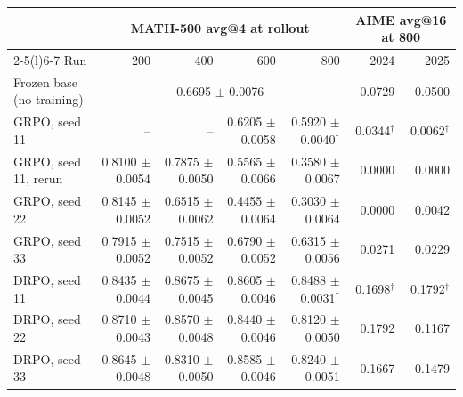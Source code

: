 \begin{tabularx}{\textwidth}{@{}Xrrrrrr@{}}
\toprule
 & \multicolumn{4}{c}{MATH-500 avg@4 at rollout} & \multicolumn{2}{c}{AIME avg@16 at 800} \\
\cmidrule(lr){2-5}\cmidrule(l){6-7}
Run & 200 & 400 & 600 & 800 & 2024 & 2025 \\
\midrule
Frozen base (no training) & \multicolumn{4}{c}{0.6695 $\pm$ 0.0076} & 0.0729 & 0.0500 \\
GRPO, seed 11 & -- & -- & 0.6205 $\pm$ 0.0058 & 0.5920 $\pm$ 0.0040$^{\dagger}$ & 0.0344$^{\dagger}$ & 0.0062$^{\dagger}$ \\
GRPO, seed 11, rerun & 0.8100 $\pm$ 0.0054 & 0.7875 $\pm$ 0.0050 & 0.5565 $\pm$ 0.0066 & 0.3580 $\pm$ 0.0067 & 0.0000 & 0.0000 \\
GRPO, seed 22 & 0.8145 $\pm$ 0.0052 & 0.6515 $\pm$ 0.0062 & 0.4455 $\pm$ 0.0064 & 0.3030 $\pm$ 0.0064 & 0.0000 & 0.0042 \\
GRPO, seed 33 & 0.7915 $\pm$ 0.0052 & 0.7515 $\pm$ 0.0052 & 0.6790 $\pm$ 0.0052 & 0.6315 $\pm$ 0.0056 & 0.0271 & 0.0229 \\
DRPO, seed 11 & 0.8435 $\pm$ 0.0044 & 0.8675 $\pm$ 0.0045 & 0.8605 $\pm$ 0.0046 & 0.8488 $\pm$ 0.0031$^{\dagger}$ & 0.1698$^{\dagger}$ & 0.1792$^{\dagger}$ \\
DRPO, seed 22 & 0.8710 $\pm$ 0.0043 & 0.8570 $\pm$ 0.0048 & 0.8440 $\pm$ 0.0046 & 0.8120 $\pm$ 0.0050 & 0.1792 & 0.1167 \\
DRPO, seed 33 & 0.8645 $\pm$ 0.0048 & 0.8310 $\pm$ 0.0050 & 0.8585 $\pm$ 0.0046 & 0.8240 $\pm$ 0.0051 & 0.1667 & 0.1479 \\
\bottomrule
\end{tabularx}
